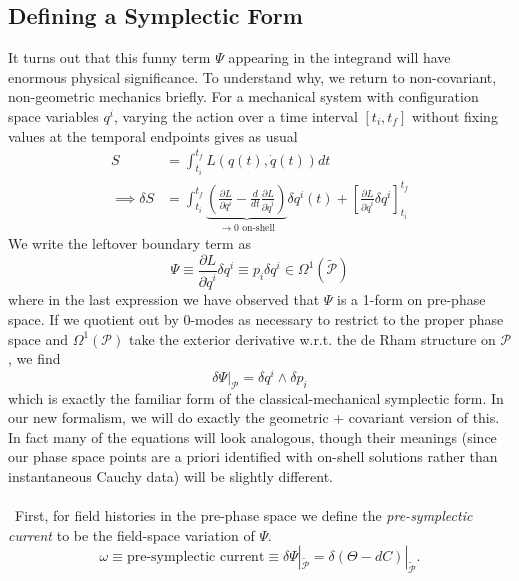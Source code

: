 \documentclass[11pt,letterpaper]{article}
\newcommand{\LP}{\left(}
\newcommand{\RP}{\right)}
\newcommand{\mc}[1]{\mathcal{#1}}
\newcommand{\PA}[2]{\frac{\partial #1}{\partial #2}}
\begin{document}
\subsection{Defining a Symplectic Form}
It turns out that this funny term $\Psi$ appearing in the integrand will have enormous physical significance. To understand why, we return to non-covariant, non-geometric mechanics briefly. For a mechanical system with configuration space variables $q^i$, varying the action over a time interval $[t_i, t_f]$ without fixing values at the temporal endpoints gives as usual \begin{equation}
\begin{aligned}
S & = \int_{t_i}^{t_f} L(q(t), \dot{q}(t)) dt \\
\implies \delta S & = \int_{t_i}^{t_f}  \underbrace{\LP \PA{L}{q^i} - \frac{d}{dt} \PA{L}{\dot{q}^i} \RP}_{\to 0 \mbox{ on-shell}} \delta q^i(t) + \left[ \PA{L}{\dot{q}^i} \delta q^i \right]_{t_i}^{t_f}
\end{aligned}
\end{equation}
We write the leftover boundary term as \begin{equation}
\Psi \equiv  \PA{L}{\dot{q}^i} \delta q^i \equiv p_i \delta q^i \in \Omega^1 \LP \tilde{\mc{P}} \RP
\end{equation}
where in the last expression we have observed that $\Psi$ is a 1-form on pre-phase space. If we quotient out by 0-modes as necessary to restrict to the proper phase space and $\Omega^1(\mc{P})$ take the exterior derivative w.r.t. the de Rham structure on $\mc{P}$, we find \begin{equation}
\delta \Psi |_{\mc{P}} = \delta q^i \wedge \delta p_i
\end{equation}
which is exactly the familiar form of the classical-mechanical symplectic form. In our new formalism, we will do exactly the geometric + covariant version of this. In fact many of the equations will look analogous, though their meanings (since our phase space points are a priori identified with on-shell solutions rather than instantaneous Cauchy data) will be slightly different.\\
\\
\
First, for field histories in the pre-phase space we define the \textit{pre-symplectic current} to be the field-space variation of $\Psi$. \begin{equation}
\omega \equiv \mbox{pre-symplectic current} \equiv \delta \Psi|_{\tilde{\mc{P}}} = \delta (\Theta - d C)|_{\tilde{\mc{P}}}.
\end{equation}
\end{document}
